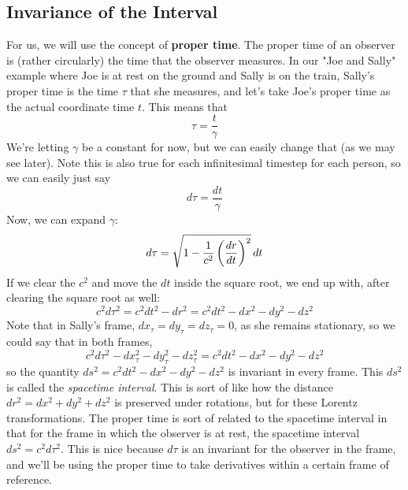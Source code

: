 \subsection{Invariance of the Interval}
For us, we will use the concept of \textbf{proper time}. The proper time of an observer is (rather circularly) the time that the observer measures. In our "Joe and Sally" example where Joe is at rest on the ground and Sally is on the train, Sally's proper time is the time $\tau$ that she measures, and let's take Joe's proper time as the actual coordinate time $t$. This means that 
\[
    \tau = \frac{t}{\gamma}
\]
We're letting $\gamma$ be a constant for now, but we can easily change that (as we may see later). Note this is also true for each infinitesimal timestep for each person, so we can easily just say 
\[
    d\tau = \frac{dt}{\gamma}
\]
Now, we can expand $\gamma$:
\[
    d\tau = \sqrt{1 - \frac{1}{c^2} \left(\frac{d r}{d t}\right)^2 }\,  dt
\]
If we clear the $c^2$ and move the $dt$ inside the square root, we end up with, after clearing the square root as well: 
\[
    c^2 d \tau^2 = c^2 dt^2 - dr^2 = c^2 dt^2 - dx^2 - dy^2 - dz^2
\]
Note that in Sally's frame, $dx_\tau = dy_\tau = dz_\tau = 0$, as she remains stationary, so we could say that in both frames, 
\[
    c^2 d \tau^2 - dx_\tau^2 - dy_\tau^2 - dz_\tau^2 = c^2 dt^2 - dx^2 - dy^2 - dz^2
\] 
so the quantity $ds^2 = c^2 dt^2 - dx^2 - dy^2 - dz^2$ is invariant in every frame. This $ds^2$ is called the \textit{spacetime interval}. This is sort of like how the distance $dr^2 = dx^2 + dy^2 + dz^2$ is preserved under rotations, but for these Lorentz transformations. The proper time is sort of related to the spacetime interval in that for the frame in which the observer is at rest, the spacetime interval $ds^2 = c^2 d\tau^2$. This is nice because $d\tau$ is an invariant for the observer in the frame, and we'll be using the proper time to take derivatives within a certain frame of reference. 

